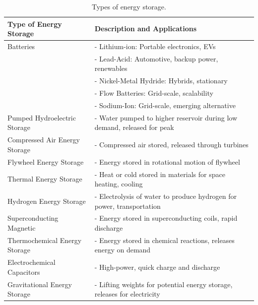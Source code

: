 \begin{center}
\begin{table}[!ht]
	\begin{center}
		\caption{Types of energy storage.}
		\label{tab:Typesofenergystorage}
		\begin{tabular}{|p{6cm}|p{8cm}|} %
			\hline
			\textbf{Type of Energy Storage} & \textbf{Description and Applications}\\
			\hline
			Batteries & - Lithium-ion: Portable electronics, EVs\\
					  & - Lead-Acid: Automotive, backup power, renewables\\
					  & - Nickel-Metal Hydride: Hybrids, stationary\\
					  & - Flow Batteries: Grid-scale, scalability\\
					  & - Sodium-Ion: Grid-scale, emerging alternative\\
			\hline
			Pumped Hydroelectric Storage & - Water pumped to higher reservoir during low demand, released for peak\\
			\hline
			Compressed Air Energy Storage & - Compressed air stored, released through turbines\\
			\hline
			Flywheel Energy Storage & - Energy stored in rotational motion of flywheel\\
			\hline
			Thermal Energy Storage & - Heat or cold stored in materials for space heating, cooling\\
			\hline
			Hydrogen Energy Storage & - Electrolysis of water to produce hydrogen for power, transportation\\
			\hline
			Superconducting Magnetic & - Energy stored in superconducting coils, rapid discharge\\
			\hline
			Thermochemical Energy Storage & - Energy stored in chemical reactions, releases energy on demand\\
			\hline
			Electrochemical Capacitors & - High-power, quick charge and discharge\\
			\hline
			Gravitational Energy Storage & - Lifting weights for potential energy storage, releases for electricity\\
			\hline
			
		\end{tabular}
	\end{center}
\end{table}
\end{center}

